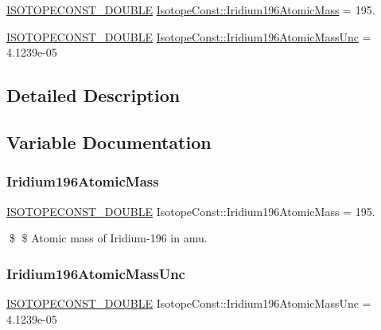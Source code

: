 \begin{DoxyCompactItemize}
\item 
\mbox{\hyperlink{group___isotope_const-_macros_ga8f45a7272ce02c0b4c65c44636ed719a}{I\+S\+O\+T\+O\+P\+E\+C\+O\+N\+S\+T\+\_\+\+D\+O\+U\+B\+LE}} \mbox{\hyperlink{group___isotope_const-_iridium-_ir196_ga687913b306614416fba9392bd19d3075}{Isotope\+Const\+::\+Iridium196\+Atomic\+Mass}} = 195.
\item 
\mbox{\hyperlink{group___isotope_const-_macros_ga8f45a7272ce02c0b4c65c44636ed719a}{I\+S\+O\+T\+O\+P\+E\+C\+O\+N\+S\+T\+\_\+\+D\+O\+U\+B\+LE}} \mbox{\hyperlink{group___isotope_const-_iridium-_ir196_ga125a96de749ee2329fbd1d80e922e296}{Isotope\+Const\+::\+Iridium196\+Atomic\+Mass\+Unc}} = 4.\+1239e-\/05
\end{DoxyCompactItemize}


\subsection{Detailed Description}


\subsection{Variable Documentation}
\mbox{\label{group___isotope_const-_iridium-_ir196_ga687913b306614416fba9392bd19d3075}} 
\subsubsection{\texorpdfstring{Iridium196\+Atomic\+Mass}{Iridium196AtomicMass}}
{\footnotesize\ttfamily \mbox{\hyperlink{group___isotope_const-_macros_ga8f45a7272ce02c0b4c65c44636ed719a}{I\+S\+O\+T\+O\+P\+E\+C\+O\+N\+S\+T\+\_\+\+D\+O\+U\+B\+LE}} Isotope\+Const\+::\+Iridium196\+Atomic\+Mass = 195.}

\$ \$ Atomic mass of Iridium-\/196 in amu. \mbox{\label{group___isotope_const-_iridium-_ir196_ga125a96de749ee2329fbd1d80e922e296}} 
\subsubsection{\texorpdfstring{Iridium196\+Atomic\+Mass\+Unc}{Iridium196AtomicMassUnc}}
{\footnotesize\ttfamily \mbox{\hyperlink{group___isotope_const-_macros_ga8f45a7272ce02c0b4c65c44636ed719a}{I\+S\+O\+T\+O\+P\+E\+C\+O\+N\+S\+T\+\_\+\+D\+O\+U\+B\+LE}} Isotope\+Const\+::\+Iridium196\+Atomic\+Mass\+Unc = 4.\+1239e-\/05}


